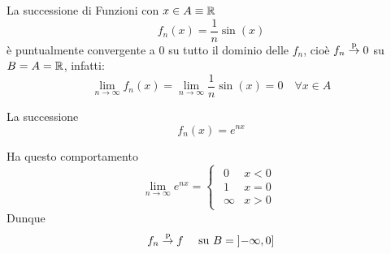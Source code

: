 \begin{example}
	\label{ex:1_over_n_sin_x_punt_conv}
	La successione di Funzioni con $x \in A \equiv \mathbb{R}$
	\[f_n(x)=\frac{1}{n} \sin(x)\]
	è puntualmente convergente a $0$ su tutto il dominio delle $f_n$, cioè $f_n \overset{\text{p}}{\to} 0$ su $B = A = \mathbb{R}$, infatti:
	\[
		\lim\limits_{n \to \infty} f_n(x) = \lim\limits_{n \to \infty} \frac{1}{n} \sin(x) = 0 \quad \forall x \in A
	\]
\end{example}
\begin{example}
	La successione
	\[f_n(x)=e^{nx}\]
	\begin{center}
	\end{center}
	Ha questo comportamento
	\[
		\lim\limits_{n \to \infty} e^{nx} =
		\begin{cases}
			\begin{array}{ll}
				0 & x<0\\
				1 & x=0\\
				\infty & x>0
			\end{array}
		\end{cases}
	\]
	Dunque
	\[f_n \overset{\text{p}}{\to} f\quad \text{ su } B = \left]-\infty,0\right]\]
\end{example}

